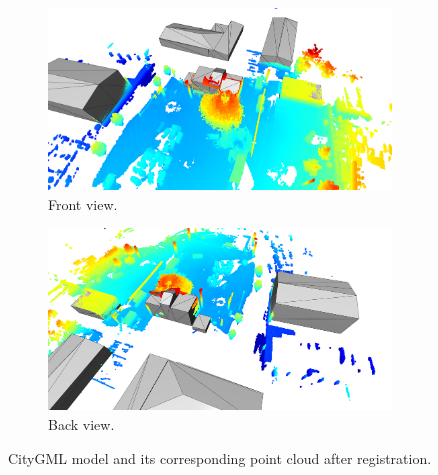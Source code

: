        \begin{figure}[H]
            \centering
            \begin{subfigure}{1\textwidth}
                \centering
                \includegraphics[scale=0.2]{images/solution_images/final_front.png}
                \caption{Front view.}
                \label{fig:final_front_model}
            \end{subfigure}
            \hfill
            \begin{subfigure}{1\textwidth}
                \centering
                \includegraphics[scale=0.2]{images/solution_images/final_back.png}
                \caption{Back view.}
                \label{fig:final_back_model}
            \end{subfigure}
            \caption{CityGML model and its corresponding point cloud after registration.}
            \label{fig:final_CityGML}
        \end{figure}

